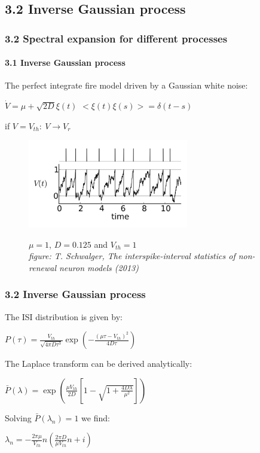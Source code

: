 \documentclass{beamer}
\begin{document}
\subsection{3.2 Inverse Gaussian process}

\begin{frame}
\frametitle{3.2 Spectral expansion for different processes}
\framesubtitle{3.1 Inverse Gaussian process}
The perfect integrate fire model driven by a Gaussian white noise:

\vspace{0.3cm}
 $\dot V=\mu +\sqrt{2D}\xi(t)$ \hspace{1cm} $<\xi(t)\xi(s)>=\delta(t-s)$

\vspace{0.2cm}
 if $V=V_{th}:\:V\rightarrow V_r$
 
 \begin{figure}
 	\centering

 		\includegraphics[width=70mm]{tilo}
 		
 		
 	\small{$\mu=1$, $D=0.125$ and $V_{th}=1$}\\
 	\tiny{
 	\textit{figure: T. Schwalger, The interspike-interval statistics of non-renewal neuron models (2013) }}
 	
 \end{figure}

\end{frame}

\begin{frame}
\frametitle{3.2 Inverse Gaussian process}
The ISI distribution is given by: 	

\vspace{0.2cm}
\hspace{2.5cm}$P(\tau)=\frac{V_{th}}{\sqrt{4\pi D\tau^3}}\exp(-\frac{(\mu\tau-V_{th})^2}{4D\tau})$


\pause
\vspace{0.3cm}
The Laplace transform can be derived analytically:

\vspace{0.2cm}
\hspace{2.5cm}$\bar{P}(\lambda)=\exp(\frac{\mu V_{th}}{2D}[1-\sqrt{1+\frac{4D\lambda}{\mu^2}}])$

\pause
\vspace{0.3cm}
Solving $\bar{P}(\lambda_n)=1$ we find:

\vspace{0.2cm}
\hspace{2.8cm} $\lambda_n=- \frac{2\pi\mu}{V_{th}}n( \frac{2\pi D}{\mu V_{th}}n + i)$



\end{frame}
\end{document}
